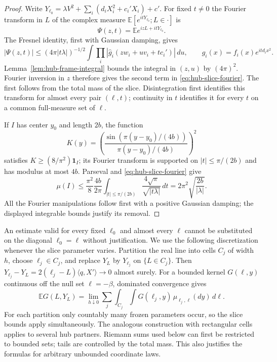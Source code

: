 \begin{proof}
Write $Y_{\ell_0}=\lambda V^2+\sum_i(d_iX_i^2+c_i'X_i)+c'$.
For fixed $t\ne0$ the Fourier transform in $L$ of the complex measure
$\mathbb E[e^{itY_{\ell_0}};L\in\cdot]$ is
\[
 \Psi(z,t)=\mathbb E e^{izL+itY_{\ell_0}}.
\]
The Fresnel identity, first with Gaussian damping, gives
\[
 |\Psi(z,t)|\le(4\pi|t\lambda|)^{-1/2}
  \int\prod_i|\widehat g_i(zw_i+uv_i+tc_i')|\,du,
 \qquad g_i(x)=f_i(x)e^{itd_ix^2}.
\]
Lemma~\ref{lem:hub-frame-integral} bounds the integral in $(z,u)$ by
$(4\pi)^2$.  Fourier inversion in $z$ therefore gives the second term
in \eqref{eq:hub-slice-fourier}.  The first follows from the total mass
of the slice.  Disintegration first identifies this transform for almost
every pair $(\ell,t)$; continuity in $t$ identifies it for every $t$ on
a common full-measure set of $\ell$.

If $I$ has center $y_0$ and length $2b$, the function
\[
 K(y)=\left(\frac{\sin(\pi(y-y_0)/(4b))}
                         {\pi(y-y_0)/(4b)}\right)^2
\]
satisfies $K\ge(8/\pi^2)\mathbf1_I$; its Fourier transform is supported
on $|t|\le\pi/(2b)$ and has modulus at most $4b$.
Parseval and \eqref{eq:hub-slice-fourier} give
\[
 \mu(I)\le\frac{\pi^2}{8}\frac{4b}{2\pi}
   \int_{|t|\le\pi/(2b)}\frac{4\sqrt\pi}{\sqrt{|t\lambda|}}\,dt
 =2\pi^2\sqrt{\frac{2b}{|\lambda|}}.
\]
All the Fourier manipulations follow first with a positive Gaussian
damping; the displayed integrable bounds justify its removal.
\end{proof}

\begin{remark}\label{rem:hub-freezing}
An estimate valid for every fixed $\ell_0$ and almost every $\ell$ cannot
be substituted on the diagonal $\ell_0=\ell$ without justification.
We use the following discretization whenever the slice parameter varies.
Partition the real line into cells $C_j$ of width $h$, choose
$\ell_j\in C_j$, and replace $Y_L$ by $Y_{\ell_j}$ on
$\{L\in C_j\}$.  Then
$Y_{\ell_j}-Y_L=2(\ell_j-L)\langle q,X'\rangle\to0$ almost surely.
For a bounded kernel $G(\ell,y)$ continuous off the null set
$\ell=-\beta$, dominated convergence gives
\begin{equation}\label{eq:hub-freezing-limit}
 \mathbb E G(L,Y_L)
 =\lim_{h\downarrow0}\sum_j\int_{C_j}\int
       G(\ell_j,y)\,\mu_{\ell_j,\ell}(dy)\,d\ell.
\end{equation}
For each partition only countably many frozen parameters occur, so the
slice bounds apply simultaneously.  The analogous construction with
rectangular cells applies to several hub partners.  Riemann sums used
below can first be restricted to bounded sets; tails are controlled by
the total mass.  This also justifies the formulas for arbitrary
unbounded coordinate laws.
\end{remark}

